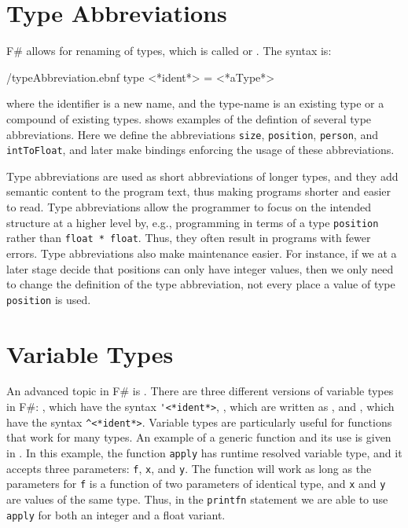 \documentclass[fsharpNotes.tex]{subfiles}
\begin{document}
\section{Type Abbreviations}
\label{sec:typeAbbreviations}
F\# allows for renaming of types, which is called  or . The syntax is:
%
\begin{verbatimwrite}{\ebnf/typeAbbreviation.ebnf}
type <*ident*> = <*aType*>
\end{verbatimwrite}
%
where the identifier is a new name, and the type-name is an existing type or a compound of existing types.  shows examples of the defintion of several type abbreviations.
%
%
Here we define the abbreviations \lstinline{size}, \lstinline{position}, \lstinline{person}, and \lstinline{intToFloat}, and later make bindings enforcing the usage of these abbreviations.

Type abbreviations are used as short abbreviations of longer types, and they add semantic content to the program text, thus making programs shorter and easier to read. Type abbreviations allow the programmer to focus on the intended structure at a higher level by, e.g., programming in terms of a type \lstinline{position} rather than \lstinline{float * float}. Thus, they often result in programs with fewer errors. Type abbreviations also make maintenance easier. For instance, if we at a later stage decide that positions can only have integer values, then we only need to change the definition of the type abbreviation, not every place a value of type \lstinline{position} is used.


\section{Variable Types}
\label{sec:variableTypes}
An advanced topic in F\# is . There are three different versions of variable types in F\#: , which have the syntax \lstinline[language=syntax]{'<*ident*>}, , which are written as \idx[_@\lstinline{_}]{\lexeme{_}}, and , which have the syntax \lstinline[language=syntax]{^<*ident*>}. Variable types are particularly useful for functions that work for many types.  An example of a generic function and its use is given in .
%
%
In this example, the function \lstinline{apply} has runtime resolved variable type, and it accepts three parameters: \lstinline{f}, \lstinline{x}, and \lstinline{y}. The function will work as long as the parameters for \lstinline{f} is a function of two parameters of identical type, and \lstinline{x} and \lstinline{y} are values of the same type. Thus, in the \lstinline{printfn} statement we are able to use \lstinline{apply} for both an integer and a float variant.
\end{document}
